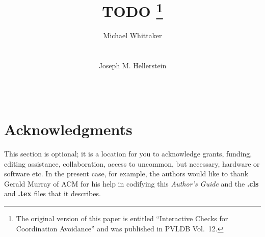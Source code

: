 \documentclass{research4cacm}
\begin{document}
\title{%
  TODO%
  \thanks{%
    The original version of this paper is entitled ``Interactive Checks for
    Coordination Avoidance'' and was published in PVLDB Vol.\ 12.
  }%
}

\author{
\alignauthor
Michael Whittaker\\
       \\
       \\
\alignauthor
Joseph M. Hellerstein\\
       \\
       \\
}

\maketitle

{}
{}
{}
{}
{}
{}
{}
{}
{}
{}


\section{Acknowledgments}
This section is optional; it is a location for you
to acknowledge grants, funding, editing assistance, collaboration, access to
uncommon, but necessary, hardware or software etc.
In the present case, for example, the
authors would like to thank Gerald Murray of ACM for
his help in codifying this \textit{Author's Guide}
and the \textbf{.cls} and \textbf{.tex} files that it describes.


\balancecolumns
\end{document}
